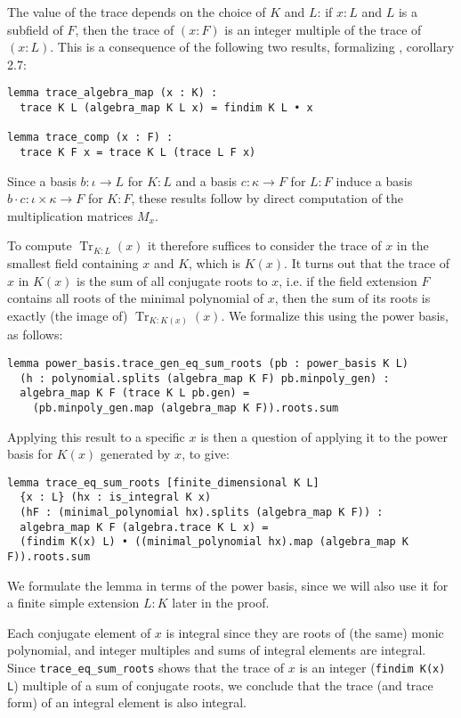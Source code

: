 \documentclass[a4paper,USenglish,cleveref, autoref, thm-restate]{lipics-v2021}
\newcommand{\lean}[1]{\texttt{#1}\xspace} %
\DeclareMathOperator{\Tr}{\mathrm{Tr}}
\begin{document}
The value of the trace depends on the choice of $K$ and $L$: if $x : L$ and $L$ is a subfield of $F$,
then the trace of $(x : F)$ is an integer multiple of the trace of $(x : L)$.
This is a consequence of the following two results, formalizing \cite{Neukirch}, corollary 2.7:
\begin{lstlisting}
lemma trace_algebra_map (x : K) :
  trace K L (algebra_map K L x) = findim K L • x

lemma trace_comp (x : F) :
  trace K F x = trace K L (trace L F x)
\end{lstlisting}
Since a basis $b : \iota \to L$ for $K : L$ and a basis $c : \kappa \to F$ for $L : F$ induce a basis $b \cdot c : \iota \times \kappa \to F$ for $K : F$,
these results follow by direct computation of the multiplication matrices $M_x$.

To compute $\Tr_{K : L}(x)$ it therefore suffices to consider the trace of $x$ in the smallest field containing $x$ and $K$, which is $K(x)$.
It turns out that the trace of $x$ in $K(x)$ is the sum of all conjugate roots to $x$,
i.e. if the field extension $F$ contains all roots of the minimal polynomial of $x$, then the sum of its roots is exactly (the image of) $\Tr_{K : K(x)}(x)$.
We formalize this using the power basis, as follows:
\begin{lstlisting}
lemma power_basis.trace_gen_eq_sum_roots (pb : power_basis K L)
  (h : polynomial.splits (algebra_map K F) pb.minpoly_gen) :
  algebra_map K F (trace K L pb.gen) =
    (pb.minpoly_gen.map (algebra_map K F)).roots.sum
\end{lstlisting}
Applying this result to a specific $x$ is then a question of applying it to the power basis for $K(x)$ generated by $x$, to give:
\begin{lstlisting}
lemma trace_eq_sum_roots [finite_dimensional K L]
  {x : L} (hx : is_integral K x)
  (hF : (minimal_polynomial hx).splits (algebra_map K F)) :
  algebra_map K F (algebra.trace K L x) =
  (findim K(x) L) • ((minimal_polynomial hx).map (algebra_map K F)).roots.sum
\end{lstlisting}
We formulate the lemma in terms of the power basis, since we will also use it for a finite simple extension $L : K$ later in the proof.

Each conjugate element of $x$ is integral since they are roots of (the same) monic polynomial,
and integer multiples and sums of integral elements are integral.
Since \lean{trace\_eq\_sum\_roots} shows that the trace of $x$ is an integer (\lean{findim K(x) L}) multiple of a sum of conjugate roots,
we conclude that the trace (and trace form) of an integral element is also integral.
\end{document}
